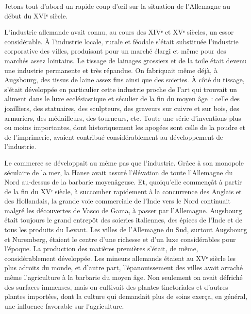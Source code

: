 \documentclass[french,twoside]{book} %
\begin{document}
\noindent Jetons tout d’abord un rapide coup d’œil sur la situation de l’Allemagne au début du XVIᵉ siècle.\par
L’industrie allemande avait connu, au cours des XIVᵉ et XVᵉ siècles, un essor considérable. À l’industrie locale, rurale et féodale s’était substituée l’industrie corporative des villes, produisant pour un marché élargi et même pour des marchés assez lointains. Le tissage de lainages grossiers et de la toile était devenu une industrie permanente et très répandue. On fabriquait même déjà, à Augsbourg, des tissus de laine assez fins ainsi que des soieries. À côté du tissage, s’était développée en particulier cette industrie proche de l’art qui trouvait un aliment dans le luxe ecclésiastique et séculier de la fin du moyen âge : celle des joailliers, des statuaires, des sculpteurs, des graveurs sur cuivre et sur bois, des armuriers, des médailleurs, des tourneurs, etc. Toute une série d’inventions plus ou moins importantes, dont historiquement les apogées sont celle de la poudre et de l’imprimerie, avaient contribué considérablement au développement de l’industrie.\par
Le commerce se développait au même pas que l’industrie. Grâce à son monopole séculaire de la mer, la Hanse avait assuré l’élévation de toute l’Allemagne du Nord au-dessus de la barbarie moyenâgeuse. Et, quoiqu’elle commençât à partir de la fin du XVᵉ siècle, à succomber rapidement à la concurrence des Anglais et des Hollandais, la grande voie commerciale de l’Inde vers le Nord continuait malgré les découvertes de Vasco de Gama, à passer par l’Allemagne. Augsbourg était toujours le grand entrepôt des soieries italiennes, des épices de l’Inde et de tous les produits du Levant. Les villes de l’Allemagne du Sud, surtout Augsbourg et Nuremberg, étaient le centre d’une richesse et d’un luxe considérables pour l’époque. La production des matières premières s’était, de même, considérablement développée. Les mineurs allemands étaient au XVᵉ siècle les plus adroits du monde, et d’autre part, l’épanouissement des villes avait arraché même l’agriculture à la barbarie du moyen âge. Non seulement on avait défriché des surfaces immenses, mais on cultivait des plantes tinctoriales et d’autres plantes importées, dont la culture qui demandait plus de soins exerça, en général, une influence favorable sur l’agriculture.\par
\end{document}
